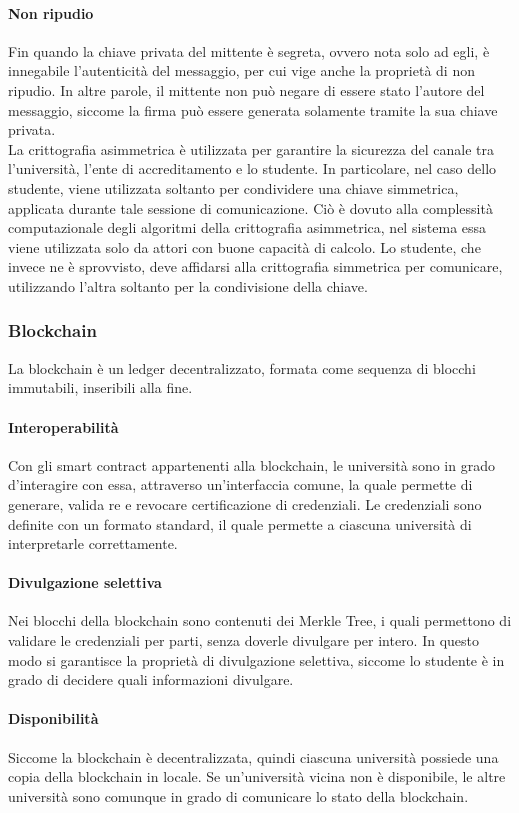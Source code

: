 \documentclass[a4paper,12pt]{article}
\begin{document}
\paragraph{Non ripudio}
Fin quando la chiave privata del mittente è segreta, ovvero nota solo ad egli, è innegabile l'autenticità del messaggio, per cui vige anche la proprietà di non ripudio. In altre parole, il mittente non può negare di essere stato l'autore del messaggio, siccome la firma può essere generata solamente tramite la sua chiave privata.
\\[1em] La crittografia asimmetrica è utilizzata per garantire la sicurezza del canale tra l'università, l'ente di accreditamento e lo studente. In particolare, nel caso dello studente, viene utilizzata soltanto per condividere una chiave simmetrica, applicata durante tale sessione di comunicazione. Ciò è dovuto alla complessità computazionale degli algoritmi della crittografia asimmetrica, nel sistema essa viene utilizzata solo da attori con buone capacità di calcolo. 
Lo studente, che invece ne è sprovvisto, deve affidarsi alla crittografia simmetrica per comunicare, utilizzando l'altra soltanto per la condivisione della chiave.
\subsubsection{Blockchain}
La blockchain è un ledger decentralizzato, formata come sequenza di blocchi immutabili, inseribili alla fine.
\paragraph{Interoperabilità} 
Con gli smart contract appartenenti alla blockchain, le università sono in grado d'interagire con essa, attraverso un'interfaccia comune, la quale permette di generare, valida re e revocare certificazione di credenziali. 
Le credenziali sono definite con un formato standard, il quale permette a ciascuna università di interpretarle correttamente.
\paragraph{Divulgazione selettiva}
Nei blocchi della blockchain sono contenuti dei Merkle Tree, i quali permettono di validare le credenziali per parti, senza doverle divulgare per intero. In questo modo si garantisce la proprietà di divulgazione selettiva, siccome lo studente è in grado di decidere quali informazioni divulgare.
\paragraph{Disponibilità }
Siccome la blockchain è decentralizzata, quindi ciascuna università possiede una copia della blockchain in locale. Se un'università vicina non è disponibile, le altre università sono comunque in grado di comunicare lo stato della blockchain.
\end{document}
